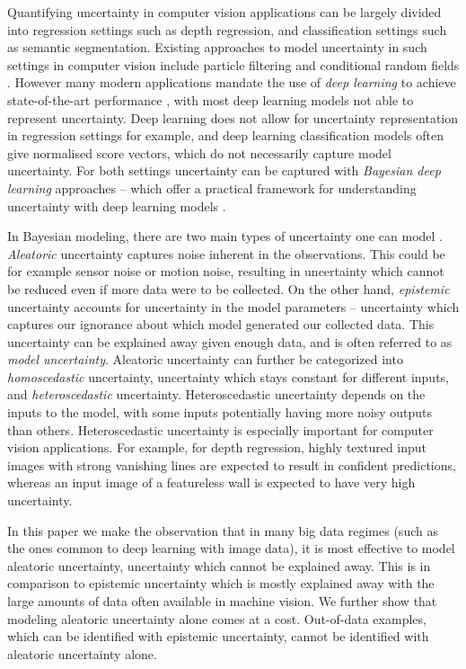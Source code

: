 \documentclass{article}
\begin{document}
Quantifying uncertainty in computer vision applications can be largely divided into regression settings such as depth regression, and classification settings such as semantic segmentation.
Existing approaches to model uncertainty in such settings in computer vision include particle filtering and conditional random fields \citep{blake1993framework,he2004multiscale}. However many modern applications mandate the use of \textit{deep learning} to achieve state-of-the-art performance \cite{he2016deep}, with most deep learning models not able to represent uncertainty.
Deep learning does not allow for uncertainty representation in regression settings for example, and deep learning classification models often give normalised score vectors, which do not necessarily capture model uncertainty. For both settings uncertainty can be captured with \textit{Bayesian deep learning} approaches --
which offer a practical framework for understanding uncertainty with deep learning models 
\cite{gal2016thesis}.



In Bayesian modeling, there are two main types of uncertainty one can model \citep{der2009aleatory}. \textit{Aleatoric} uncertainty captures noise inherent in the observations.
This could be for example sensor noise or motion noise, resulting in uncertainty which cannot be reduced even if more data were to be collected.
On the other hand, \textit{epistemic} uncertainty accounts for uncertainty in the model parameters -- uncertainty which captures our ignorance about which model generated our collected data. 
This uncertainty can be explained away given enough data, and is often referred to as \textit{model uncertainty}. Aleatoric uncertainty can further be categorized into \textit{homoscedastic} uncertainty, uncertainty which stays constant for different inputs, and \textit{heteroscedastic} uncertainty. Heteroscedastic uncertainty depends on the inputs to the model, with some inputs potentially having more noisy outputs than others. 
Heteroscedastic uncertainty is especially important for computer vision applications. For example, for depth regression, highly textured input images with strong vanishing lines are expected to result in confident predictions, whereas an input image of a featureless wall is expected to have very high uncertainty.

In this paper we make the observation that in many big data regimes (such as the ones common to deep learning with image data), it is most effective to model aleatoric uncertainty, uncertainty which cannot be explained away.
This is in comparison to epistemic uncertainty which is mostly explained away with the large amounts of data often available in machine vision.
We further show that modeling aleatoric uncertainty alone comes at a cost. Out-of-data examples, which can be identified with epistemic uncertainty, cannot be identified with aleatoric uncertainty alone. 
\end{document}
